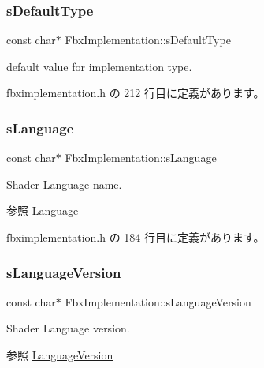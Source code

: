 \subsubsection{\texorpdfstring{s\+Default\+Type}{sDefaultType}}
{\footnotesize\ttfamily const char$\ast$ Fbx\+Implementation\+::s\+Default\+Type\hspace{0.3cm}{\ttfamily [static]}}



default value for implementation type. 



 fbximplementation.\+h の 212 行目に定義があります。

\mbox{\label{class_fbx_implementation_a41bf4828ad34699046cf66d915a9a01b}} 
\subsubsection{\texorpdfstring{s\+Language}{sLanguage}}
{\footnotesize\ttfamily const char$\ast$ Fbx\+Implementation\+::s\+Language\hspace{0.3cm}{\ttfamily [static]}}

Shader Language name. \begin{DoxySeeAlso}{参照}
\hyperlink{class_fbx_implementation_acda7f6c31ffe13c69bd3dbfa972a6fac}{Language} 
\end{DoxySeeAlso}


 fbximplementation.\+h の 184 行目に定義があります。

\mbox{\label{class_fbx_implementation_aef3358d9d9f6e48d7d1f806ec7999298}} 
\subsubsection{\texorpdfstring{s\+Language\+Version}{sLanguageVersion}}
{\footnotesize\ttfamily const char$\ast$ Fbx\+Implementation\+::s\+Language\+Version\hspace{0.3cm}{\ttfamily [static]}}

Shader Language version. \begin{DoxySeeAlso}{参照}
\hyperlink{class_fbx_implementation_aebb544e23225701b6e92cd058bc09bab}{Language\+Version} 
\end{DoxySeeAlso}


